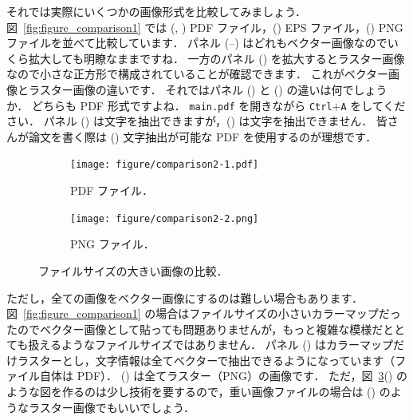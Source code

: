 それでは実際にいくつかの画像形式を比較してみましょう．
図~\ref{fig:figure_comparison1} では (, ) PDF ファイル，() EPS ファイル，() PNG ファイルを並べて比較しています．
パネル (--) はどれもベクター画像なのでいくら拡大しても明瞭なままですね．
一方のパネル () を拡大するとラスター画像なので小さな正方形で構成されていることが確認できます．
これがベクター画像とラスター画像の違いです．
それではパネル () と () の違いは何でしょうか．
どちらも PDF 形式ですよね．
\verb|main.pdf| を開きながら \verb|Ctrl|+\verb|A| をしてください．
パネル () は文字を抽出できますが，() は文字を抽出できません．
皆さんが論文を書く際は () 文字抽出が可能な PDF を使用するのが理想です．

\begin{figure}[tp]
    \centering
    \begin{subfigure}{0.45\columnwidth}
        \centering
        \texttt{[image: figure/comparison2-1.pdf]}
        \caption{PDF ファイル．}
        \label{subfig:figcomp2_pdf}
    \end{subfigure}
    \hspace{3mm} %
    \begin{subfigure}{0.45\columnwidth}
        \centering
        \texttt{[image: figure/comparison2-2.png]}
        \caption{PNG ファイル．}
        \label{subfig:figcomp2_png}
    \end{subfigure}
    \caption{ファイルサイズの大きい画像の比較．}
    \label{fig:figure_comparison2}
\end{figure}

ただし，全ての画像をベクター画像にするのは難しい場合もあります．
図~\ref{fig:figure_comparison1} の場合はファイルサイズの小さいカラーマップだったのでベクター画像として貼っても問題ありませんが，もっと複雑な模様だととても扱えるようなファイルサイズではありません．
パネル () はカラーマップだけラスターとし，文字情報は全てベクターで抽出できるようになっています（ファイル自体は PDF）．
() は全てラスター（PNG）の画像です．
ただ，図~\ref{fig:figure_comparison2}() のような図を作るのは少し技術を要するので，重い画像ファイルの場合は () のようなラスター画像でもいいでしょう．


